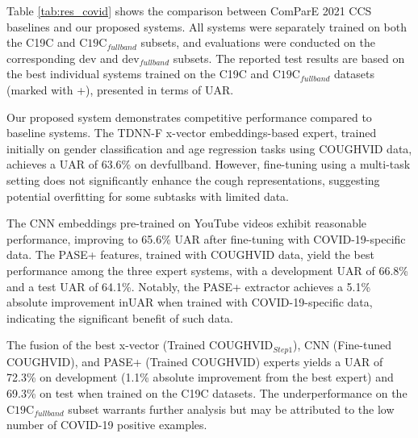   Table \ref{tab:res_covid} shows the comparison between ComParE 2021 CCS baselines and our proposed systems. All systems were separately trained on both the C19C and $\text{C19C}_{fullband}$ subsets, and evaluations were conducted on the corresponding dev and $\text{dev}_{fullband}$ subsets. The reported test results are based on the best individual systems trained on the C19C and $\text{C19C}_{fullband}$ datasets (marked with +), presented in terms of \ac{UAR}.

  Our proposed system demonstrates competitive performance compared to baseline systems. The \ac{TDNN-F} x-vector embeddings-based expert, trained initially on gender classification and age regression tasks using COUGHVID data, achieves a \ac{UAR} of 63.6\% on devfullband. However, fine-tuning using a multi-task setting does not significantly enhance the cough representations, suggesting potential overfitting for some subtasks with limited data.
  
  The \ac{CNN} embeddings pre-trained on YouTube videos exhibit reasonable performance, improving to 65.6\% \ac{UAR} after fine-tuning with COVID-19-specific data. The \ac{PASE}+ features, trained with COUGHVID data, yield the best performance among the three expert systems, with a development \ac{UAR} of 66.8\% and a test \ac{UAR} of 64.1\%. Notably, the \ac{PASE}+ extractor achieves a 5.1\% absolute improvement in\ac{UAR} when trained with COVID-19-specific data, indicating the significant benefit of such data.
  
  The fusion of the best x-vector (Trained COUGHVID$_{Step1}$), \ac{CNN} (Fine-tuned COUGHVID), and \ac{PASE}+ (Trained COUGHVID) experts yields a \ac{UAR} of 72.3\% on development (1.1\% absolute improvement from the best expert) and 69.3\% on test when trained on the C19C datasets. The underperformance on the $\text{C19C}_{fullband}$ subset warrants further analysis but may be attributed to the low number of COVID-19 positive examples.


